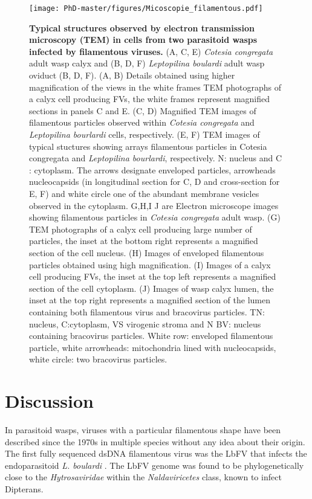  \begin{figure}[H]
\texttt{[image: PhD-master/figures/Micoscopie\_filamentous.pdf]}\centering
\caption[Paper2:TEM images of filamentous viral particles]{\textbf{Typical structures observed by electron transmission microscopy (TEM) in cells from two parasitoid wasps infected by filamentous viruses.} (A, C, E) \textit{Cotesia congregata} adult wasp calyx and (B, D, F) \textit{Leptopilina boulardi} adult wasp oviduct (B, D, F). (A, B) Details obtained using higher magnification of the views in the white frames TEM photographs of a calyx cell producing FVs, the white frames represent magnified sections in panels C and E. (C, D) Magnified TEM images of filamentous particles observed within \textit{Cotesia congregata} and \textit{Leptopilina bourlardi} cells, respectively. (E, F) TEM images of typical stuctures showing arrays filamentous particles in Cotesia congregata and \textit{Leptopilina bourlardi}, respectively. N: nucleus and C : cytoplasm. The arrows designate enveloped particles, arrowheads nucleocapsids (in longitudinal section for C, D and cross-section for E, F) and white circle one of the abundant membrane vesicles observed in the cytoplasm. G,H,I J are Electron microscope images showing filamentous particles in \textit{Cotesia congregata} adult wasp. (G) TEM photographs of a calyx cell producing large number of particles, the inset at the bottom right represents a magnified section of the cell nucleus. (H) Images of enveloped filamentous particles obtained using high magnification. (I) Images of a calyx cell producing FVs, the inset at the top left represents a magnified section of the cell cytoplasm. (J) Images of wasp calyx lumen, the inset at the top right represents a magnified section of the lumen containing both filamentous virus and bracovirus particles. TN: nucleus, C:cytoplasm, VS virogenic stroma and N BV: nucleus containing bracovirus particles. White row: enveloped filamentous particle, white arrowheads: mitochondria lined with nucleocapsids, white circle: two bracovirus particles.}
\label{figure:Micoscopie_filamentous}
\end{figure}


\section{Discussion}

In parasitoid wasps, viruses with a particular filamentous shape have been described since the 1970s in multiple species without any idea about their origin. The first fully sequenced dsDNA filamentous virus was the LbFV that infects the endoparasitoid \textit{L. boulardi} \citep{lepetit_genome_2017}. The LbFV genome was found to be phylogenetically close to the \textit{Hytrosaviridae} within the \textit{Naldaviricetes} class, known to infect Dipterans. 

